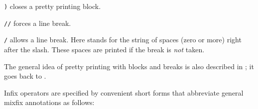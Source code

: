 \begin{isabellebody}
\begin{isamarkuptext}
\begin{description}
  \item \verb|)| closes a pretty printing block.

  \item \verb|//| forces a line break.

  \item \verb|/| allows a line break.  Here 
  stands for the string of spaces (zero or more) right after the
  slash.  These spaces are printed if the break is \emph{not} taken.

  \end{description}

  The general idea of pretty printing with blocks and breaks is also
  described in \cite{paulson-ml2}; it goes back to \cite{Oppen:1980}.%
\end{isamarkuptext}%
\isamarkuptrue%
%
\isamarkuptrue%
%
\begin{isamarkuptext}%
Infix operators are specified by convenient short forms that
  abbreviate general mixfix annotations as follows:

  \begin{center}
  \begin{tabular}{lll}


\end{tabular}
\end{center}
\end{isamarkuptext}
\end{isabellebody}
